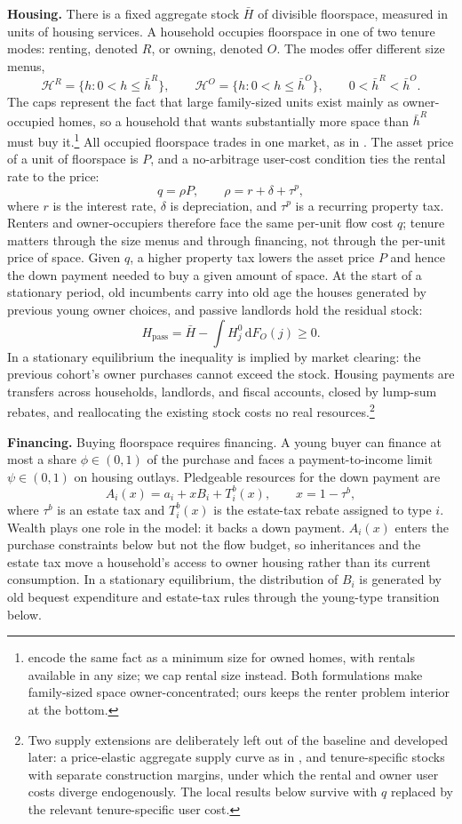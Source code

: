 \documentclass[11pt]{article}
\newcommand{\dd}{\mathrm d}
\newcommand{\1}{\mathbf 1}
\newcommand{\HH}{\mathcal H}
\begin{document}
\textbf{Housing.} There is a fixed aggregate stock $\bar H$ of divisible floorspace, measured in units of housing services. A household occupies floorspace in one of two tenure modes: renting, denoted $R$, or owning, denoted $O$. The modes offer different size menus,
\[
\HH^R=\{h:0<h\le \bar h^R\},
\qquad
\HH^O=\{h:0<h\le \bar h^O\},
\qquad
0<\bar h^R<\bar h^O.
\]
The caps represent the fact that large family-sized units exist mainly as owner-occupied homes, so a household that wants substantially more space than $\bar h^R$ must buy it.\footnote{\citet{coven2024} encode the same fact as a minimum size for owned homes, with rentals available in any size; we cap rental size instead. Both formulations make family-sized space owner-concentrated; ours keeps the renter problem interior at the bottom.} All occupied floorspace trades in one market, as in \citet{coven2024}. The asset price of a unit of floorspace is $P$, and a no-arbitrage user-cost condition ties the rental rate to the price:
\begin{equation}
q=\rho P,
\qquad
\rho=r+\delta+\tau^p,
\label{eq:compact_owner_price}
\end{equation}
where $r$ is the interest rate, $\delta$ is depreciation, and $\tau^p$ is a recurring property tax. Renters and owner-occupiers therefore face the same per-unit flow cost $q$; tenure matters through the size menus and through financing, not through the per-unit price of space. Given $q$, a higher property tax lowers the asset price $P$ and hence the down payment needed to buy a given amount of space. At the start of a stationary period, old incumbents carry into old age the houses generated by previous young owner choices, and passive landlords hold the residual stock:
\[
H_{\mathrm{pass}}
=
\bar H-\int H_j^0\,\dd F_O(j)\ge0.
\]
In a stationary equilibrium the inequality is implied by market clearing: the previous cohort's owner purchases cannot exceed the stock. Housing payments are transfers across households, landlords, and fiscal accounts, closed by lump-sum rebates, and reallocating the existing stock costs no real resources.\footnote{Two supply extensions are deliberately left out of the baseline and developed later: a price-elastic aggregate supply curve as in \citet{coven2024}, and tenure-specific stocks with separate construction margins, under which the rental and owner user costs diverge endogenously. The local results below survive with $q$ replaced by the relevant tenure-specific user cost.}

\textbf{Financing.} Buying floorspace requires financing. A young buyer can finance at most a share $\phi\in(0,1)$ of the purchase and faces a payment-to-income limit $\psi\in(0,1)$ on housing outlays. Pledgeable resources for the down payment are
\[
A_i(x)=a_i+xB_i+T_i^b(x),
\qquad
x=1-\tau^b,
\]
where $\tau^b$ is an estate tax and $T_i^b(x)$ is the estate-tax rebate assigned to type $i$. Wealth plays one role in the model: it backs a down payment. $A_i(x)$ enters the purchase constraints below but not the flow budget, so inheritances and the estate tax move a household's access to owner housing rather than its current consumption. In a stationary equilibrium, the distribution of $B_i$ is generated by old bequest expenditure and estate-tax rules through the young-type transition below.
\end{document}
